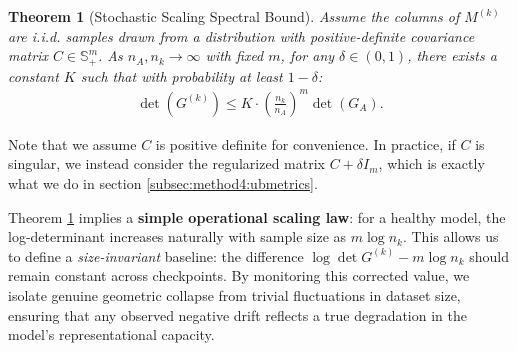 \documentclass{article}
\theoremstyle{plain}
\newtheorem{theorem}{Theorem}
\theoremstyle{definition}
\theoremstyle{remark}
\begin{document}
\begin{theorem}[Stochastic Scaling Spectral Bound]
\label{thm:stochastic}
Assume the columns of $M^{(k)}$ are i.i.d. samples drawn from a distribution with positive-definite covariance matrix $C \in \mathbb{S}^m_{+}$. As $n_A, n_k \to \infty$ with fixed $m$, for any $\delta \in (0, 1)$, there exists a constant $K$ such that with probability at least $1-\delta$:
\begin{align}
    \det(G^{(k)}) \le K \cdot \left(\frac{n_k}{n_A}\right)^m \det(G_A).
\end{align}
\end{theorem}
Note that we assume $C$ is positive definite for convenience. In practice, if $C$ is singular, we instead consider the regularized matrix $C+\delta I_m$, which is exactly what we do in section \ref{subsec:method4:ubmetrics}.

Theorem \ref{thm:stochastic} implies a \textbf{simple operational scaling law}: for a healthy model, the log-determinant increases naturally with sample size as $m \log n_k$.
This allows us to define a \emph{size-invariant} baseline: the difference $\log\det G^{(k)} - m\log n_k$ should remain constant across checkpoints.
By monitoring this corrected value, we isolate genuine geometric collapse from trivial fluctuations in dataset size, ensuring that any observed negative drift reflects a true degradation in the model's representational capacity.
\end{document}
